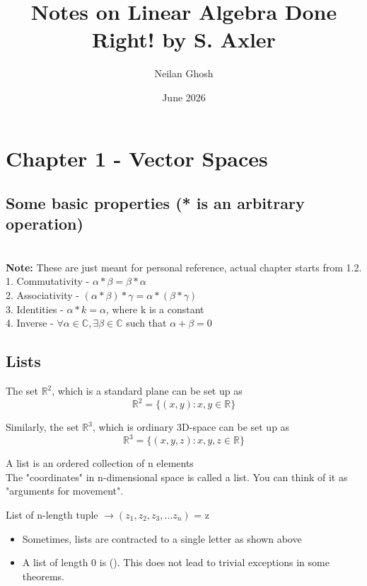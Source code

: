 \documentclass{article}
\title{Notes on Linear Algebra Done Right! by S. Axler}
\author{Neilan Ghosh}
\date{June 2026}
\begin{document}
\maketitle
\section{Chapter 1 - Vector Spaces}
\subsection{Some basic properties (* is an arbitrary operation)} \\
\textbf{Note:} These are just meant for personal reference, actual chapter starts from 1.2. \\
1. Commutativity - $\alpha * \beta = \beta * \alpha$ \\
2. Associativity - $(\alpha*\beta)*\gamma = \alpha*(\beta*\gamma)$ \\
3. Identities - $\alpha * k = \alpha$, where k is a constant \\
4. Inverse - $\forall \alpha \in \mathbb{C}, \exists \beta \in \mathbb{C}$ such that $\alpha + \beta = 0$ 
\subsection{Lists}
The set $\mathbb{R}^{2}$, which is a standard plane can be set up as \\
\begin{equation}
    \mathbb{R}^2 = \{(x,y): x,y \in \mathbb{R}\}
\end{equation}

Similarly, the set $\mathbb{R}^3$, which is ordinary 3D-space can be set up as
\begin{equation}
    \mathbb{R}^3 = \{(x,y,z): x,y,z \in \mathbb{R}\}
\end{equation}

A list is an ordered collection of n elements \\ 
The "coordinates" in n-dimensional space is called a list. You can think of it as "arguments for movement". \\
\begin{center}
    List of n-length tuple $\rightarrow (z_1, z_2, z_3,...z_n)$ = z 
\end{center}
\begin{itemize}
    \item Sometimes, lists are contracted to a single letter as shown above 
    \item A list of length 0 is (). This does not lead to trivial exceptions in some theorems. 
\end{itemize}
\end{document}
